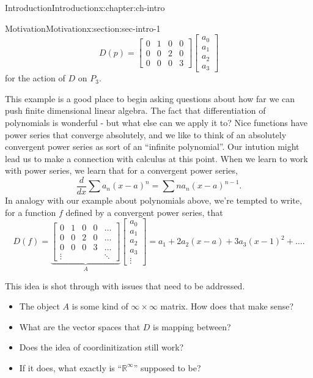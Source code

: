 \documentclass[oneside,10pt,]{book}
\numberwithin{equation}{section}
\newcommand{\R}{\mathbb{R}}
\newcommand\bbm{\begin{bmatrix}}
\newcommand\ebm{\end{bmatrix}}
\numberwithin{equation}{section}
\newcommand{\amp}{&}
\begin{document}
\begin{chapterptx}{Introduction}{}{Introduction}{}{}{x:chapter:ch-intro}
\begin{sectionptx}{Motivation}{}{Motivation}{}{}{x:section:sec-intro-1}
\begin{equation*}
D(p) = \bbm 0 \amp 1 \amp 0 \amp 0 \\ 0 \amp 0 \amp 2 \amp 0 \\ 0 \amp 0 \amp 0 \amp 3 \ebm \bbm a_0 \\ a_1 \\ a_2 \\ a_3 \ebm
\end{equation*}
for the action of \(D\) on \(P_3\).%
\par
This example is a good place to begin asking questions about how far we can push finite dimensional linear algebra. The fact that differentiation of polynomials is wonderful - but what else can we apply it to? Nice functions have power series that converge absolutely, and we like to think of an absolutely convergent power series as sort of an ``infinite polynomial''. Our intution might lead us to make a connection with calculus at this point. When we learn to work with power series, we learn that for a convergent power series,%
\begin{equation*}
\frac{d}{dx} \sum a_n (x-a)^n = \sum n a_n (x-a)^{n-1}.
\end{equation*}
In analogy with our example about polynomials above, we're tempted to write, for a function \(f\) defined by a convergent power series, that%
\begin{equation*}
D(f) =  \underbrace{\bbm 0 \amp 1 \amp 0 \amp 0 \amp \ldots \\ 0 \amp 0 \amp 2 \amp 0 \amp \ldots \\ 0 \amp 0 \amp 0 \amp 3 \amp \ldots \\ \vdots \amp \amp \amp \amp \ddots \ebm}_{A} \bbm a_0 \\ a_1 \\ a_2 \\ a_3 \\ \vdots \ebm = a_1 + 2a_2 (x - a) + 3 a_3 (x-1)^2 + \ldots.
\end{equation*}
%
\par
This idea is shot through with issues that need to be addressed.%
\begin{itemize}[label=\textbullet]
\item{}The object \(A\) is some kind of \(\infty \times \infty\) matrix. How does that make sense?%
\item{}What are the vector spaces that \(D\) is mapping between?%
\item{}Does the idea of coordinitization still work?%
\item{}If it does, what exactly is ``\(\R^\infty\)'' supposed to be?%

\end{itemize}
\end{sectionptx}
\end{chapterptx}
\end{document}
